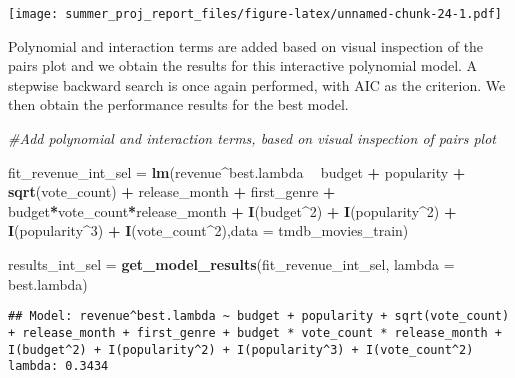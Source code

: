 \documentclass[
]{article}
\newenvironment{Shaded}{\begin{snugshade}}{\end{snugshade}}
\newcommand{\CommentTok}[1]{\textcolor[rgb]{0.56,0.35,0.01}{\textit{#1}}}
\newcommand{\DataTypeTok}[1]{\textcolor[rgb]{0.13,0.29,0.53}{#1}}
\newcommand{\DecValTok}[1]{\textcolor[rgb]{0.00,0.00,0.81}{#1}}
\newcommand{\KeywordTok}[1]{\textcolor[rgb]{0.13,0.29,0.53}{\textbf{#1}}}
\newcommand{\NormalTok}[1]{#1}
\newcommand{\OperatorTok}[1]{\textcolor[rgb]{0.81,0.36,0.00}{\textbf{#1}}}
\newcommand{\StringTok}[1]{\textcolor[rgb]{0.31,0.60,0.02}{#1}}
\begin{document}
\texttt{[image: summer\_proj\_report\_files/figure-latex/unnamed-chunk-24-1.pdf]}

Polynomial and interaction terms are added based on visual inspection of
the pairs plot and we obtain the results for this interactive polynomial
model. A stepwise backward search is once again performed, with AIC as
the criterion. We then obtain the performance results for the best
model.

\begin{Shaded}
\begin{Highlighting}[]
\CommentTok{#Add polynomial and interaction terms, based on visual inspection of pairs plot}

\NormalTok{fit_revenue_int_sel =}\StringTok{ }\KeywordTok{lm}\NormalTok{(revenue}\OperatorTok{^}\NormalTok{best.lambda  }\OperatorTok{~}\StringTok{ }\NormalTok{budget }\OperatorTok{+}\StringTok{ }\NormalTok{popularity }\OperatorTok{+}\StringTok{ }\KeywordTok{sqrt}\NormalTok{(vote_count) }\OperatorTok{+}\StringTok{ }\NormalTok{release_month }\OperatorTok{+}\StringTok{ }\NormalTok{first_genre }\OperatorTok{+}\StringTok{  }\NormalTok{budget}\OperatorTok{*}\NormalTok{vote_count}\OperatorTok{*}\NormalTok{release_month }\OperatorTok{+}\StringTok{ }\KeywordTok{I}\NormalTok{(budget}\OperatorTok{^}\DecValTok{2}\NormalTok{) }\OperatorTok{+}\StringTok{ }\KeywordTok{I}\NormalTok{(popularity}\OperatorTok{^}\DecValTok{2}\NormalTok{) }\OperatorTok{+}\StringTok{  }\KeywordTok{I}\NormalTok{(popularity}\OperatorTok{^}\DecValTok{3}\NormalTok{) }\OperatorTok{+}\StringTok{ }\KeywordTok{I}\NormalTok{(vote_count}\OperatorTok{^}\DecValTok{2}\NormalTok{),}\DataTypeTok{data =}\NormalTok{ tmdb_movies_train)}

\NormalTok{results_int_sel =}\StringTok{ }\KeywordTok{get_model_results}\NormalTok{(fit_revenue_int_sel, }\DataTypeTok{lambda =}\NormalTok{ best.lambda)}
\end{Highlighting}
\end{Shaded}

\begin{verbatim}
## Model: revenue^best.lambda ~ budget + popularity + sqrt(vote_count) + release_month + first_genre + budget * vote_count * release_month + I(budget^2) + I(popularity^2) + I(popularity^3) + I(vote_count^2) lambda: 0.3434
\end{verbatim}
\end{document}
